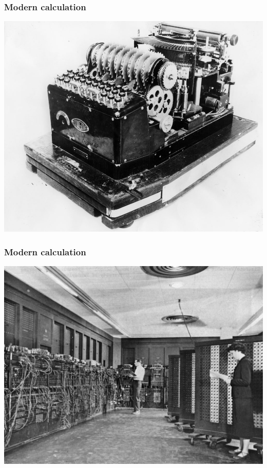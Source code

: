 \documentclass[11pt]{beamer}
\begin{document}
\begin{frame}[fragile]
  \frametitle{Modern calculation}

  \includegraphics[height=0.75\textheight]{./img/enigma.jpg}
\end{frame}

\begin{frame}[fragile]
  \frametitle{Modern calculation}

  \includegraphics[height=0.75\textheight]{./img/eniac.jpg}
\end{frame}
\end{document}
